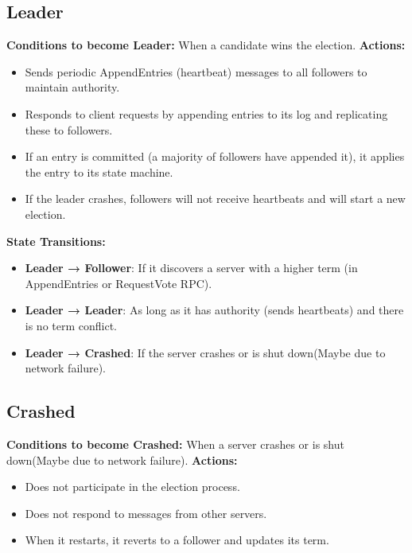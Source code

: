 \subsection{Leader}
\textbf{Conditions to become Leader:} When a candidate wins the election.
\newline
\textbf{Actions:}
\begin{itemize}
    \item Sends periodic AppendEntries (heartbeat) messages to all followers to maintain
        authority.

    \item Responds to client requests by appending entries to its log and replicating
        these to followers.

    \item If an entry is committed (a majority of followers have appended it),
        it applies the entry to its state machine.

    \item If the leader crashes, followers will not receive heartbeats and will
        start a new election.
\end{itemize}

\textbf{State Transitions:}
\begin{itemize}
    \item \textbf{Leader → Follower}: If it discovers a server with a higher term
        (in AppendEntries or RequestVote RPC).

    \item \textbf{Leader → Leader}: As long as it has authority (sends
        heartbeats) and there is no term conflict.

    \item \textbf{Leader → Crashed}: If the server crashes or is shut down(Maybe
        due to network failure).
\end{itemize}

\subsection{Crashed}
\textbf{Conditions to become Crashed:} When a server crashes or is shut down(Maybe
due to network failure).
\newline
\textbf{Actions:}
\begin{itemize}
    \item Does not participate in the election process.

    \item Does not respond to messages from other servers.

    \item When it restarts, it reverts to a follower and updates its term.
\end{itemize}

